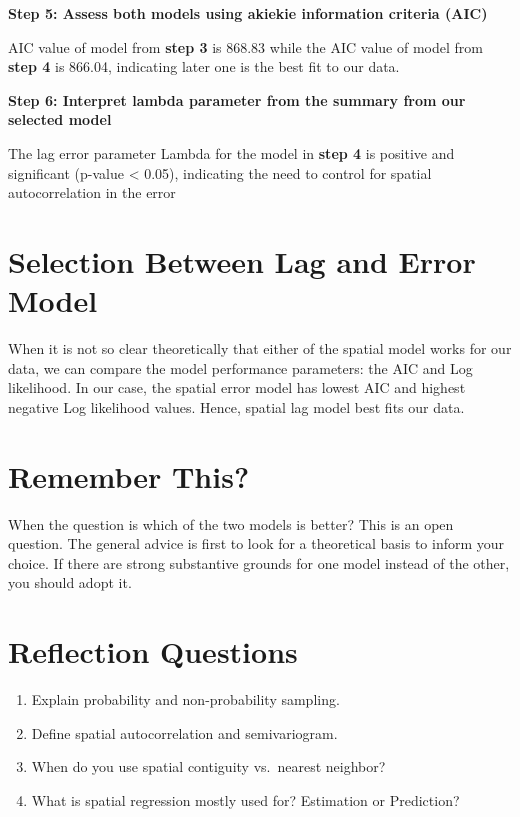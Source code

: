 \documentclass[
]{book}
\providecommand{\tightlist}{%
  \setlength{\itemsep}{0pt}\setlength{\parskip}{0pt}}
\begin{document}
\textbf{Step 5: Assess both models using akiekie information criteria (AIC)}

AIC value of model from \textbf{step 3} is 868.83 while the AIC value of model from \textbf{step 4} is 866.04, indicating later one is the best fit to our data.

\textbf{Step 6: Interpret lambda parameter from the summary from our selected model}

The lag error parameter Lambda for the model in \textbf{step 4} is positive and significant (p-value \textless{} 0.05), indicating the need to control for spatial autocorrelation in the error

\hypertarget{selection-between-lag-and-error-model}{%
\section{Selection Between Lag and Error Model}\label{selection-between-lag-and-error-model}}

When it is not so clear theoretically that either of the spatial model works for our data, we can compare the model performance parameters: the AIC and Log likelihood. In our case, the spatial error model has lowest AIC and highest negative Log likelihood values. Hence, spatial lag model best fits our data.

\hypertarget{remember-this-1}{%
\section*{Remember This?}\label{remember-this-1}}

When the question is which of the two models is better? This is an open question. The general advice is first to look for a theoretical basis to inform your choice. If there are strong substantive grounds for one model instead of the other, you should adopt it.

\hypertarget{reflection-questions-7}{%
\section*{Reflection Questions}\label{reflection-questions-7}}

\begin{enumerate}
\def\labelenumi{\arabic{enumi}.}
\tightlist
\item
  Explain probability and non-probability sampling.
\item
  Define spatial autocorrelation and semivariogram.
\item
  When do you use spatial contiguity vs.~nearest neighbor?
\item
  What is spatial regression mostly used for? Estimation or Prediction?
\end{enumerate}
\end{document}
